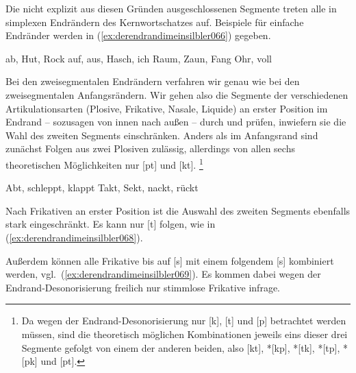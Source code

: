 Die nicht explizit aus diesen Gründen ausgeschlossenen Segmente treten alle in simplexen Endrändern des Kernwortschatzes auf.
Beispiele für einfache Endränder werden in (\ref{ex:derendrandimeinsilbler066}) gegeben.

\Stretch[0.25]

\begin{exe}
  \ex\label{ex:derendrandimeinsilbler066}
  \begin{xlist}
    \ex ab, Hut, Rock
    \ex auf, aus, Hasch, ich
    \ex Raum, Zaun, Fang
    \ex Ohr, voll
  \end{xlist}
\end{exe}

\Stretch[0.25]

Bei den zweisegmentalen Endrändern verfahren wir genau wie bei den zweisegmentalen Anfangsrändern.
Wir gehen also die Segmente der verschiedenen Artikulationsarten (Plosive, Frikative, Nasale, Liquide) an erster Position im Endrand -- sozusagen von innen nach außen -- durch und prüfen, inwiefern sie die Wahl des zweiten Segments einschränken.
Anders als im Anfangsrand sind zunächst Folgen aus zwei Plosiven zulässig, allerdings von allen sechs theoretischen Möglichkeiten nur [pt] und [kt].%
\footnote{Da wegen der Endrand-Desonorisierung nur [k], [t] und [p] betrachtet werden müssen, sind die theoretisch möglichen Kombinationen jeweils eins dieser drei Segmente gefolgt von einem der anderen beiden, also [kt], *[kp], *[tk], *[tp], *[pk] und [pt].}

\Stretch[0.25]

\begin{exe}
  \ex\label{ex:derendrandimeinsilbler067}
  \begin{xlist}
    \ex Abt, schleppt, klappt
    \ex Takt, Sekt, nackt, rückt
  \end{xlist}
\end{exe}

\Stretch[0.25]

Nach Frikativen an erster Position ist die Auswahl des zweiten Segments ebenfalls stark eingeschränkt.
Es kann nur [t] folgen, wie in (\ref{ex:derendrandimeinsilbler068}).

\Stretch[0.25]

\begin{exe}
\end{exe}

\Stretch[0.25]

Außerdem können alle Frikative bis auf [s] mit einem folgendem [s] kombiniert werden, vgl.\ (\ref{ex:derendrandimeinsilbler069}).
Es kommen dabei wegen der Endrand-Desonorisierung freilich nur stimmlose Frikative infrage.

